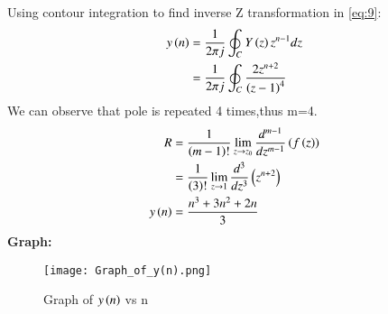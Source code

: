 \documentclass[journal,12pt,twocolumn]{IEEEtran}
\theoremstyle{remark}
\begin{document}
Using contour integration to find inverse Z transformation in \eqref{eq:9}:
\begin{align}
     y\left(n\right) & =  \frac{1}{2\pi j} \oint_C Y\left(z\right) z^{n-1} dz\label{eq:10}\\
   &=\frac{1}{2\pi j}\oint_{C}\frac{2z^{n+2}}{\left(z-1\right)^4}\label{eq:11}
\end{align}
We can observe that pole is repeated 4 times,thus m=4.
\begin{align}
 R&=\frac{1}{\left(m-1\right)!}\lim\limits_{z\to z_{0}}\frac{d^{m-1}}{dz^{m-1}}\left(f\left(z\right)\right)\label{eq:12}\\
 &=\frac{1}{\left(3\right)!}\lim\limits_{z\to 1}\frac{d^{3}}{dz^{3}}\left(z^{n+2}\right)\label{eq:13}\\
 y\left(n\right)&=\frac{n^3+3n^2+2n}{3}\label{eq:14}
\end{align}
\textbf{Graph:}
\begin{figure}[h]
        \centering
\texttt{[image: Graph\_of\_y(n).png]}
\caption{Graph of $y\left(n\right)$ vs n}
\label{fig:enter-label}
\end{figure}
\end{document}
